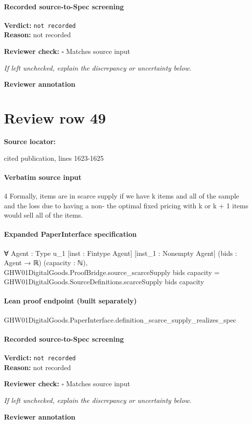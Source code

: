 \documentclass[10pt]{article}
\newcommand{\reviewerbox}{%
  \par\noindent\fbox{\parbox{0.96\linewidth}{\rule{0pt}{0.38in}}}\par
}
\newcommand{\reviewmatch}[1]{%
  \par\noindent\textbf{Reviewer check:} $\square$\; #1\par
  \noindent\emph{If left unchecked, explain the discrepancy or uncertainty below.}\par
}
\begin{document}
\paragraph{Recorded source-to-Spec screening}
\textbf{Verdict:} \texttt{not recorded}
\\
\textbf{Reason:} not recorded
\reviewmatch{Matches source input}
\noindent\textbf{Reviewer annotation}\par
\reviewerbox
\clearpage
\hypertarget{source-claim-2aae9bf386f351db}{}
\section*{Review row 49}
\textbf{Source locator:} {\footnotesize\raggedright cited publication, lines 1623-\allowbreak{}1625\par}
\paragraph{Verbatim source input}
\begin{ReviewVerbatim}
4 Formally, items are in scarce supply if we have k items and
all of the sample and the loss due to having a non- the optimal fixed pricing with k or k + 1 items would sell all
of the items.
\end{ReviewVerbatim}


\paragraph{Expanded PaperInterface specification}
\begin{ReviewVerbatim}
∀ {Agent : Type u_1} [inst : Fintype Agent] [inst_1 : Nonempty Agent] (bids : Agent → ℝ) (capacity : ℕ),
  GHW01DigitalGoods.ProofBridge.source_scarceSupply bids capacity =
    GHW01DigitalGoods.SourceDefinitions.scarceSupply bids capacity
\end{ReviewVerbatim}

\paragraph{Lean proof endpoint (built separately)}\begin{ReviewVerbatim}
GHW01DigitalGoods.PaperInterface.definition_scarce_supply_realizes_spec
\end{ReviewVerbatim}

\paragraph{Recorded source-to-Spec screening}
\textbf{Verdict:} \texttt{not recorded}
\\
\textbf{Reason:} not recorded
\reviewmatch{Matches source input}
\noindent\textbf{Reviewer annotation}\par
\reviewerbox
\end{document}
